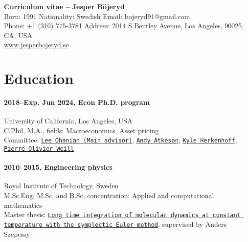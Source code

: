 \documentclass[letterpaper,10pt]{article}
\begin{document}
\begin{center}
{\Large \textbf{Curriculum vitae -- Jesper Böjeryd}}\\[3pt]
Born: 1991 \hspace{6pt} Nationality: Swedish \hspace{6pt} Email: bojeryd91@gmail.com \\
Phone: +1 (310) 775-3781 \hspace{6pt} Address: 2014 S Bentley Avenue, Los Angeles, 90025, CA, USA \\
\url{www.jesperbojeryd.se}
\end{center}

\section*{Education}
\paragraph{2018--Exp. Jun 2024, Econ Ph.D. program}\hfill University of California, Los Angeles, USA\\
C.Phil, M.A., fields: Macroeconomics, Asset pricing\\
Committee: \href{https://www.leeohanian.com/}{\texttt{Lee Ohanian (Main advisor)}}, \href{https://sites.google.com/site/andyatkeson/}{\texttt{Andy Atkeson}}, \href{https://sites.google.com/site/kyleherkenhoff/}{\texttt{Kyle Herkenhoff}}, \href{https://sites.google.com/site/pierreolivierweill/}{\texttt{Pierre-Olivier Weill}}

\paragraph{2010--2015, Engineering physics}\hfill Royal Institute of Technology, Sweden\\
M.Sc.Eng, M.Sc, and B.Sc, concentration: Applied and computational mathematics\\
Master thesis: \href{https://www.diva-portal.org/smash/record.jsf?pid=diva2\%3A808180&dswid=-588}{\texttt{Long time integration of mole\-cular dynamics at constant  temperature with the symplectic Euler method}}, supervised by  Anders Szepessy

\end{document}
